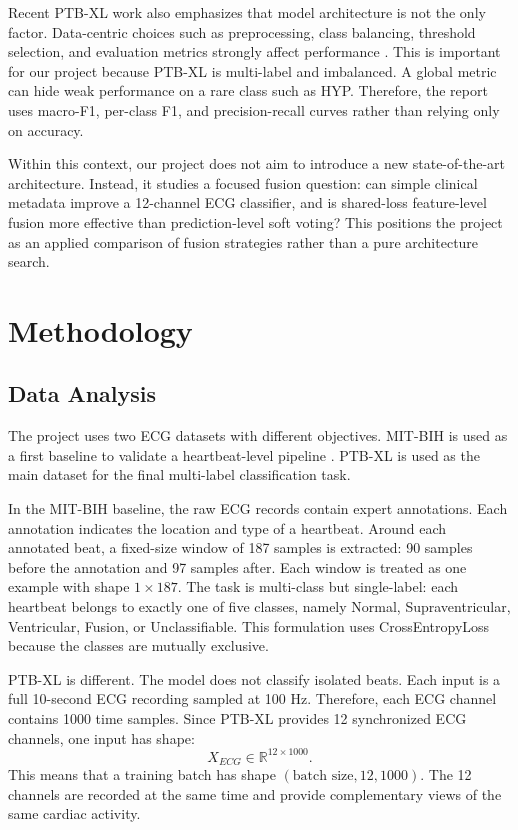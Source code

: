 \documentclass[11pt,a4paper]{article}
\begin{document}
Recent PTB-XL work also emphasizes that model architecture is not the only factor. Data-centric choices such as preprocessing, class balancing, threshold selection, and evaluation metrics strongly affect performance \cite{mehdi2026ptbxl}. This is important for our project because PTB-XL is multi-label and imbalanced. A global metric can hide weak performance on a rare class such as HYP. Therefore, the report uses macro-F1, per-class F1, and precision-recall curves rather than relying only on accuracy.

Within this context, our project does not aim to introduce a new state-of-the-art architecture. Instead, it studies a focused fusion question: can simple clinical metadata improve a 12-channel ECG classifier, and is shared-loss feature-level fusion more effective than prediction-level soft voting? This positions the project as an applied comparison of fusion strategies rather than a pure architecture search.

\section{Methodology}

\subsection{Data Analysis}

The project uses two ECG datasets with different objectives. MIT-BIH is used as a first baseline to validate a heartbeat-level pipeline \cite{moody2001mitbih}. PTB-XL is used as the main dataset for the final multi-label classification task.

In the MIT-BIH baseline, the raw ECG records contain expert annotations. Each annotation indicates the location and type of a heartbeat. Around each annotated beat, a fixed-size window of 187 samples is extracted: 90 samples before the annotation and 97 samples after. Each window is treated as one example with shape \(1 \times 187\). The task is multi-class but single-label: each heartbeat belongs to exactly one of five classes, namely Normal, Supraventricular, Ventricular, Fusion, or Unclassifiable. This formulation uses CrossEntropyLoss because the classes are mutually exclusive.

PTB-XL is different. The model does not classify isolated beats. Each input is a full 10-second ECG recording sampled at 100 Hz. Therefore, each ECG channel contains 1000 time samples. Since PTB-XL provides 12 synchronized ECG channels, one input has shape:
\[
X_{ECG} \in \mathbb{R}^{12 \times 1000}.
\]
This means that a training batch has shape \((\text{batch size},12,1000)\). The 12 channels are recorded at the same time and provide complementary views of the same cardiac activity.
\end{document}
